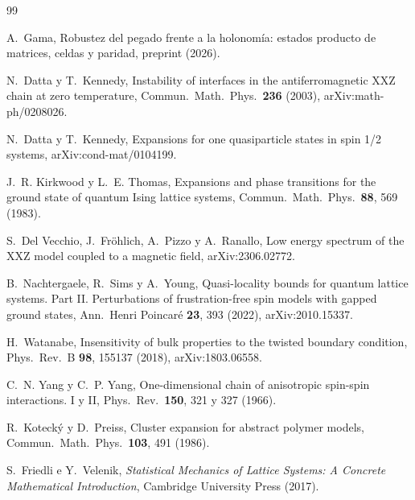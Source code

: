\documentclass[11pt,a4paper]{article}
\theoremstyle{remark}
\begin{document}
\begin{thebibliography}{99}

A.~Gama, Robustez del pegado frente a la holonomía: estados producto de matrices, celdas y
paridad, preprint (2026).

N.~Datta y T.~Kennedy, Instability of interfaces in the antiferromagnetic XXZ chain at zero
temperature, Commun.\ Math.\ Phys.\ \textbf{236} (2003), arXiv:math-ph/0208026.

N.~Datta y T.~Kennedy, Expansions for one quasiparticle states in spin 1/2 systems,
arXiv:cond-mat/0104199.

J.~R. Kirkwood y L.~E. Thomas, Expansions and phase transitions for the ground state of quantum
Ising lattice systems, Commun.\ Math.\ Phys.\ \textbf{88}, 569 (1983).

S.~Del Vecchio, J.~Fröhlich, A.~Pizzo y A.~Ranallo, Low energy spectrum of the XXZ model coupled
to a magnetic field, arXiv:2306.02772.

B.~Nachtergaele, R.~Sims y A.~Young, Quasi-locality bounds for quantum lattice systems. Part II.
Perturbations of frustration-free spin models with gapped ground states, Ann.\ Henri Poincaré
\textbf{23}, 393 (2022), arXiv:2010.15337.

H.~Watanabe, Insensitivity of bulk properties to the twisted boundary condition, Phys.\ Rev.\ B
\textbf{98}, 155137 (2018), arXiv:1803.06558.

C.~N. Yang y C.~P. Yang, One-dimensional chain of anisotropic spin-spin interactions. I y II,
Phys.\ Rev.\ \textbf{150}, 321 y 327 (1966).

R.~Kotecký y D.~Preiss, Cluster expansion for abstract polymer models, Commun.\ Math.\ Phys.\
\textbf{103}, 491 (1986).

S.~Friedli e Y.~Velenik, \emph{Statistical Mechanics of Lattice Systems: A Concrete Mathematical
Introduction}, Cambridge University Press (2017).

\end{thebibliography}
\end{document}
